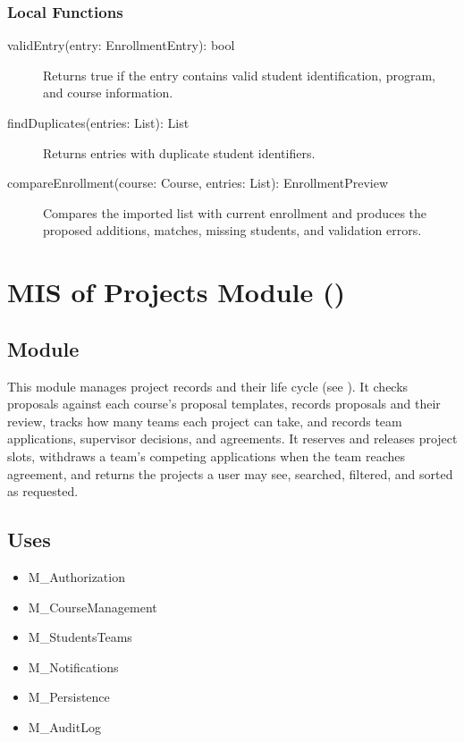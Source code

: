 \documentclass[12pt, titlepage]{article}
\newcommand{\descriptiveid}[1]{\texttt{\detokenize{#1}}}
\newcommand{\srsurl}{https://ayushpatel2026.github.io/Keystone/SRS/SRS.pdf}
\newcommand{\srsref}[1]{\href{\srsurl\#nameddest=#1}{\descriptiveid{#1}}}
\newcommand{\moduleid}[1]{\texttt{\detokenize{#1}}}
\begin{document}
\subsubsection{Local Functions}

\begin{description}
    \item[validEntry(entry: EnrollmentEntry): bool]
    Returns true if the entry contains valid student identification, program, and course information.

    \item[findDuplicates(entries: List): List]
    Returns entries with duplicate student identifiers.

    \item[compareEnrollment(course: Course, entries: List): EnrollmentPreview]
    Compares the imported list with current enrollment and produces the proposed additions, matches, missing students, and validation errors.
\end{description}

\newpage

\section[MIS of Projects Module]{MIS of Projects Module (\moduleid{M_Projects})}
\label{M_Projects}

\subsection{Module}

This module manages project records and their life cycle (see \srsref{FIG-Lifecycle}). It checks proposals against each course's proposal templates, records proposals and their review, tracks how many teams each project can take, and records team applications, supervisor decisions, and agreements. It reserves and releases project slots, withdraws a team's competing applications when the team reaches agreement, and returns the projects a user may see, searched, filtered, and sorted as requested.

\subsection{Uses}

\begin{itemize}
    \item M\_Authorization
    \item M\_CourseManagement
    \item M\_StudentsTeams
    \item M\_Notifications
    \item M\_Persistence
    \item M\_AuditLog
\end{itemize}
\end{document}
